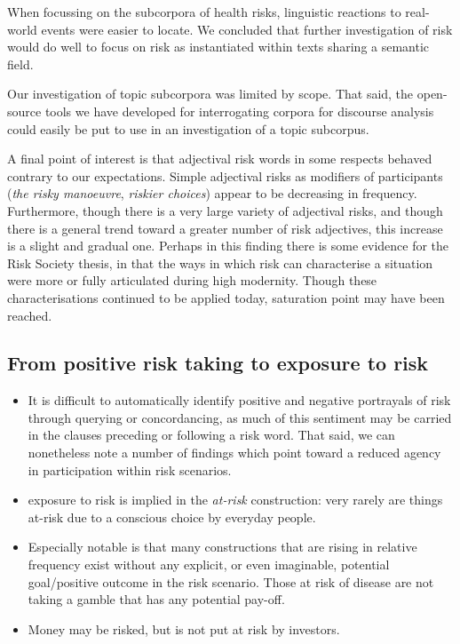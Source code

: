 When focussing on the subcorpora of health risks, linguistic reactions to real-world events were easier to locate. We concluded that further investigation of risk would do well to focus on risk as instantiated within texts sharing a semantic field. 

Our investigation of topic subcorpora was limited by scope. That said, the open-source tools we have developed for interrogating corpora for discourse analysis could easily be put to use in an investigation of a topic subcorpus.


A final point of interest is that adjectival risk words in some respects behaved contrary to our expectations. Simple adjectival risks as modifiers of participants (\emph{the risky manoeuvre}, \emph{riskier choices}) appear to be decreasing in frequency. Furthermore, though there is a very large variety of adjectival risks, and though there is a general trend toward a greater number of risk adjectives, this increase is a slight and gradual one. Perhaps in this finding there is some evidence for the Risk Society thesis, in that the ways in which risk can characterise a situation were more or fully articulated during high modernity. Though these characterisations continued to be applied today, saturation point may have been reached.

\subsection*{From positive risk taking to exposure to risk}

\begin{itemize}
\item It is difficult to automatically identify positive and negative portrayals of risk through querying or concordancing, as much of this sentiment may be carried in the clauses preceding or following a risk word. That said, we can nonetheless note a number of findings which point toward a reduced agency in participation within risk scenarios.
\item exposure to risk is implied in the \emph{at-risk} construction: very rarely are things at-risk due to a conscious choice by everyday people.
\item Especially notable is that many constructions that are rising in relative frequency exist without any explicit, or even imaginable, potential goal\slash positive outcome in the risk scenario. Those at risk of disease are not taking a gamble that has any potential pay-off.
\item Money may be risked, but is not put at risk by investors.
\end{itemize}

